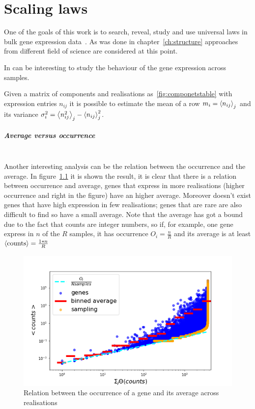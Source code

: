 \chapter{Scaling laws}\label{ch:scalinglaws}
One of the goals of this work is to search, reveal, study and use universal laws in bulk gene expression data~\nocite{altmann2016statistical}.
As was done in chapter~\ref{ch:structure} approaches from different field of science are considered at this point.

In can be interesting to study the behaviour of the gene expression across samples.

Given a matrix of components and realisations as~\ref{fig:componetstable} with expression entries $n_{i j}$ it is possible to estimate the mean of a row $m_i=\left\langle n_{i
 j}\right\rangle_j$ and its variance $\sigma^2_{i}=\left\langle n_{i j}^2\right\rangle_j - \left\langle n_{i j}\right\rangle^2_j$.



\paragraph{Average versus occurrence}\mbox{}\\
Another interesting analysis can be the relation between the occurrence and the average. In figure~\ref{fig:scalinglaws/gtex/meanDiff_binned_sampling} it is shown the result, it is clear that there is a relation between occurrence and average, genes that express in more realisations (higher occurrence and right in the figure) have an higher average. Moreover doesn't exist genes that have high expression in few realisations; genes that are rare are also difficult to find so have a small average. Note that the average has got a bound due to the fact that counts are integer numbers, so if, for example, one gene express in $n$ of the $R$ samples, it has occurrence $O_i=\frac{n}{R}$ and its average is at least $\left\langle \mathrm{counts}\right\rangle=\frac{1*n}{R}$
\begin{figure}[htb!]
    \centering
    \includegraphics[width=0.9\linewidth]{pictures/scalinglaws/gtex/meanDiff_binned_sampling.png}
    \caption{Relation between the occurrence of a gene and its average across realisations}
    \label{fig:scalinglaws/gtex/meanDiff_binned_sampling}
\end{figure}
